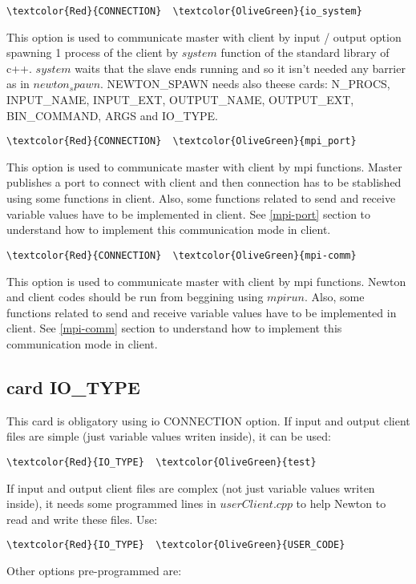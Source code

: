 \begin{Verbatim}[frame=single,commandchars=\\\{\}]
\textcolor{Red}{CONNECTION}  \textcolor{OliveGreen}{io_system}
\end{Verbatim}
This option is used to communicate master with client by input / output option spawning 1 process of the client by $system$ function of the standard library of c++. $system$ waits that the slave ends running and so it isn't needed any barrier as in $newton_spawn$. NEWTON_SPAWN needs also theese cards: N_PROCS, INPUT_NAME, INPUT_EXT, OUTPUT_NAME, OUTPUT_EXT, BIN_COMMAND, ARGS and IO_TYPE.

\begin{Verbatim}[frame=single,commandchars=\\\{\}]
\textcolor{Red}{CONNECTION}  \textcolor{OliveGreen}{mpi_port}
\end{Verbatim}
This option is used to communicate master with client by mpi functions. Master publishes a port to connect with client and then connection has to be stablished using some functions in client. Also, some functions related to send and receive variable values have to be implemented in client. See \ref{mpi-port} section to understand how to implement this communication mode in client.

\begin{Verbatim}[frame=single,commandchars=\\\{\}]
\textcolor{Red}{CONNECTION}  \textcolor{OliveGreen}{mpi-comm}
\end{Verbatim}
This option is used to communicate master with client by mpi functions. Newton and client codes should be run from beggining using $mpirun$. Also, some functions related to send and receive variable values have to be implemented in client. See \ref{mpi-comm} section to understand how to implement this communication mode in client.

\subsection{card IO_TYPE}
This card is obligatory using io CONNECTION option.
If input and output client files are simple (just variable values writen inside), it can be used:
\begin{Verbatim}[frame=single,commandchars=\\\{\}]
\textcolor{Red}{IO_TYPE}  \textcolor{OliveGreen}{test}
\end{Verbatim}
If input and output client files are complex (not just variable values writen inside), it needs some programmed lines in $userClient.cpp$ to help Newton to read and write these files. Use:
\begin{Verbatim}[frame=single,commandchars=\\\{\}]
\textcolor{Red}{IO_TYPE}  \textcolor{OliveGreen}{USER_CODE}
\end{Verbatim}
Other options pre-programmed are:

